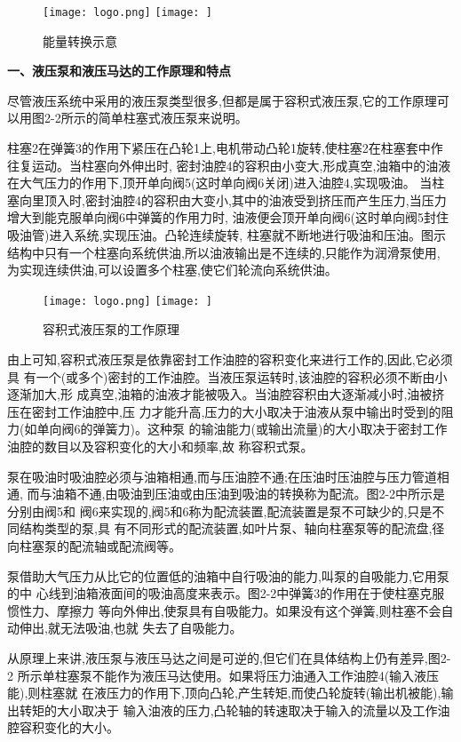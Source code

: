 \begin{figure}[h]
\centering
\ifOpenSource
\texttt{[image: logo.png]}
\else
\texttt{[image: ]}
\fi
\caption{能量转换示意}
\label{fig:fig0201}
\end{figure}

\textbf{一、液压泵和液压马达的工作原理和特点}

尽管液压系统中采用的液压泵类型很多,但都是属于容积式液压泵,它的工作原理可以用图2-2所示的简单柱塞式液压泵来说明。

柱塞2在弹簧3的作用下紧压在凸轮1上,电机带动凸轮1旋转,使柱塞2在柱塞套中作往复运动。当柱塞向外伸出时,
密封油腔4的容积由小变大,形成真空,油箱中的油液在大气压力的作用下,顶开单向阀5(这时单向阀6关闭)进入油腔4,实现吸油。
当柱塞向里顶入时,密封油腔4的容积由大变小,其中的油液受到挤压而产生压力,当压力增大到能克服单向阀6中弹簧的作用力时,
油液便会顶开单向阀6(这时单向阀5封住吸油管)进入系统,实现压油。凸轮连续旋转,
柱塞就不断地进行吸油和压油。图示结构中只有一个柱塞向系统供油,所以油液输出是不连续的,只能作为润滑泵使用,
为实现连续供油,可以设置多个柱塞,使它们轮流向系统供油。

\begin{figure}[h]
\centering
\ifOpenSource
\texttt{[image: logo.png]}
\else
\texttt{[image: ]}
\fi
\caption{容积式液压泵的工作原理}
\label{fig:fig0202}
\end{figure}

由上可知,容积式液压泵是依靠密封工作油腔的容积变化来进行工作的,因此,它必须具
有一个(或多个)密封的工作油腔。当液压泵运转时,该油腔的容积必须不断由小逐渐加大,形
成真空,油箱的油液才能被吸入。当油腔容积由大逐渐减小时,油被挤压在密封工作油腔中,压
力才能升高,压力的大小取决于油液从泵中输出时受到的阻力(如单向阀6的弹簧力)。这种泵
的输油能力(或输出流量)的大小取决于密封工作油腔的数目以及容积变化的大小和频率,故
称容积式泵。

泵在吸油时吸油腔必须与油箱相通,而与压油腔不通;在压油时压油腔与压力管道相通,
而与油箱不通,由吸油到压油或由压油到吸油的转换称为配流。图2-2中所示是分别由阀5和
阀6来实现的,阀5和6称为配流装置,配流装置是泵不可缺少的,只是不同结构类型的泵,具
有不同形式的配流装置,如叶片泵、轴向柱塞泵等的配流盘,径向柱塞泵的配流轴或配流阀等。

泵借助大气压力从比它的位置低的油箱中自行吸油的能力,叫泵的自吸能力,它用泵的中
心线到油箱液面间的吸油高度来表示。图2-2中弹簧3的作用在于使柱塞克服惯性力、摩擦力
等向外伸出,使泵具有自吸能力。如果没有这个弹簧,则柱塞不会自动伸出,就无法吸油,也就
失去了自吸能力。

从原理上来讲,液压泵与液压马达之间是可逆的,但它们在具体结构上仍有差异,图2-2
所示单柱塞泵不能作为液压马达使用。如果将压力油通入工作油腔4(输入液压能),则柱塞就
在液压力的作用下,顶向凸轮,产生转矩,而使凸轮旋转(输出机被能),输出转矩的大小取决于
输入油液的压力,凸轮轴的转速取决于输入的流量以及工作油腔容积变化的大小。

